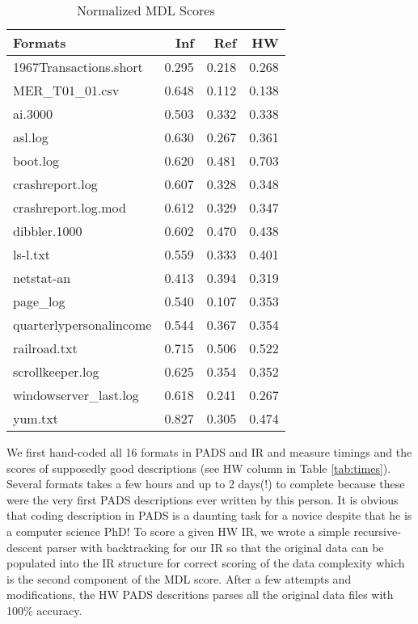 \begin{table}
\begin{center}
\begin{tabular}{|l||r|r|r|} \hline
Formats  			& Inf 		&Ref 		& HW 	 \\ \hline \hline
1967Transactions.short          & 0.295 	&0.218 		&0.268	 \\ \hline
MER\_T01\_01.csv                & 0.648 	&0.112		&0.138	 \\ \hline
ai.3000                         & 0.503		&0.332		&0.338	 \\ \hline
asl.log                         & 0.630		&0.267		&0.361	 \\ \hline
boot.log                        & 0.620		&0.481		&0.703	 \\ \hline
crashreport.log                 & 0.607		&0.328		&0.348	 \\ \hline
crashreport.log.mod             & 0.612		&0.329		&0.347	 \\ \hline
dibbler.1000                    & 0.602		&0.470		&0.438	 \\ \hline
ls-l.txt                        & 0.559		&0.333		&0.401	 \\ \hline
netstat-an                      & 0.413		&0.394		&0.319	 \\ \hline
page\_log                       & 0.540		&0.107		&0.353	 \\ \hline
quarterlypersonalincome         & 0.544		&0.367		&0.354	 \\ \hline
railroad.txt                    & 0.715		&0.506		&0.522	 \\ \hline
scrollkeeper.log                & 0.625		&0.354		&0.352	 \\ \hline
windowserver\_last.log          & 0.618		&0.241		&0.267	 \\ \hline
yum.txt                         & 0.827		&0.305		&0.474	 \\ \hline
\end{tabular}
\caption{Normalized MDL Scores}
\label{tab:scores}
\end{center}
\end{table}


We first hand-coded all 16 formats in PADS and IR and measure timings and the scores 
of supposedly good descriptions (see HW column in Table \ref{tab:times}). 
Several formats takes a few hours and up to 2 days(!) to complete because these were the very first 
PADS descriptions ever written by this person. It is obvious that coding description
in PADS is a daunting task for a novice despite that he is a computer science PhD!
To score a given HW IR, we wrote a simple recursive-descent parser with backtracking
for our IR so that the original data can be populated into the IR structure for
correct scoring of the data complexity which is the second component of the MDL score.
After a few attempts and modifications, the HW PADS descritions parses all 
the original data files with 100\% accuracy.


